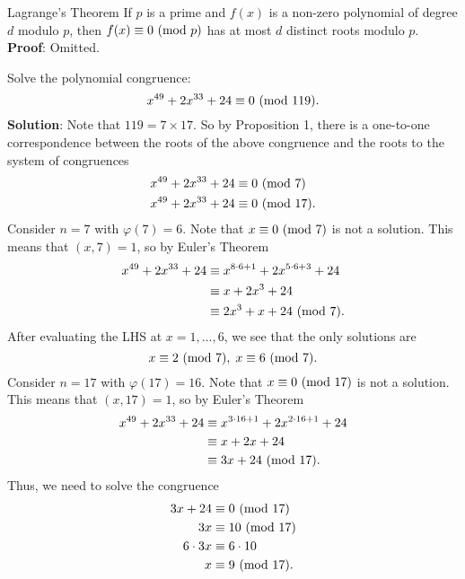 \begin{Proposition}{Lagrange's Theorem}{}
    If $ p $ is a prime and $ f(x) $ is a non-zero polynomial of degree $ d $ modulo $ p $,
    then $ f(x)\equiv 0\ (\mathrm{mod}\ p) $ has at most $ d $ distinct roots modulo $ p $.
    \tcblower{}
    \textbf{Proof}: Omitted.
\end{Proposition}
\begin{Example}{}{}
    Solve the polynomial congruence:
    \[ x^{49}+2x^{33}+24\equiv 0\ (\mathrm{mod}\ 119). \]
    \tcblower{}
    \textbf{Solution}: Note that $ 119=7\times 17 $. So by Proposition 1, there is a one-to-one correspondence
    between the roots of the above congruence and the roots to the
    system of congruences
    \begin{align*}
        x^{49}+2x^{33}+24 & \equiv 0\ (\mathrm{mod}\ 7)   \\
        x^{49}+2x^{33}+24 & \equiv 0\ (\mathrm{mod}\ 17).
    \end{align*}
    Consider $ n=7 $ with $ \varphi(7)=6 $. Note that $ x\equiv 0\ (\mathrm{mod}\ 7) $ is not a solution. This means that $ (x,7)=1 $,
    so by Euler's Theorem
    \begin{align*}
        x^{49}+2x^{33}+24 & \equiv x^{8\cdot 6+1}+2x^{5\cdot 6+3}+24 \\
                          & \equiv x+2x^3+24                         \\
                          & \equiv 2x^3+x+24\ (\mathrm{mod}\ 7).
    \end{align*}
    After evaluating the LHS at $ x=1,\ldots,6 $, we see that the only solutions are
    \[ x\equiv 2\ (\mathrm{mod}\ 7),\; x\equiv 6\ (\mathrm{mod}\ 7). \]
    Consider $ n=17 $ with $ \varphi(17)=16 $. Note that $ x\equiv 0\ (\mathrm{mod}\ 17) $ is not a solution.
    This means that $ (x,17)=1 $, so by Euler's Theorem
    \begin{align*}
        x^{49}+2x^{33}+24 & \equiv x^{3\cdot 16+1}+2x^{2\cdot 16+1}+24 \\
                          & \equiv x+2x+24                             \\
                          & \equiv 3x+24\ (\mathrm{mod}\ 17).
    \end{align*}
    Thus, we need to solve the congruence
    \begin{align*}
        3x+24     & \equiv 0\ (\mathrm{mod}\ 17)  \\
        3x        & \equiv 10\ (\mathrm{mod}\ 17) \\
        6\cdot 3x & \equiv 6\cdot 10  \\
        x         & \equiv 9\ (\mathrm{mod}\ 17).
    \end{align*}

\end{Example}
